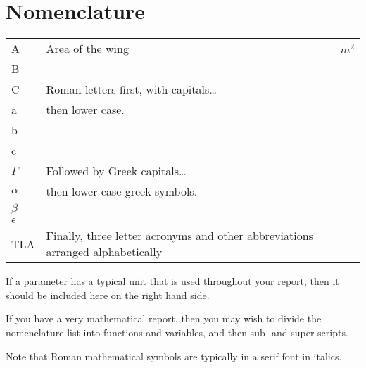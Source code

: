 \documentclass[a4paper,oneside,12pt]{book}
\begin{document}
\section*{\Huge{Nomenclature}}
\begin{tabular}{lp{9cm}l}
    A        & Area of the wing                                                               & $m^{2}$ \\
    B                                                                                                   \\
    C        & Roman letters first, with capitals\ldots                                                 \\
    a        & then lower case.                                                                         \\
    b                                                                                                   \\
    c                                                                                                   \\
    $\Gamma$ & Followed by Greek capitals\ldots                                                         \\
    $\alpha$ & then lower case greek symbols.                                                           \\
    $\beta$                                                                                             \\
    $\epsilon$                                                                                          \\
    TLA      & Finally, three letter acronyms and other abbreviations arranged alphabetically           \\
\end{tabular}
\vspace{2cm}

If a parameter has a typical unit that is used throughout your report, then it should be included here on the right hand side.

If you have a very mathematical report, then you may wish to divide the nomenclature list into functions and variables, and then sub- and super-scripts.

Note that Roman mathematical symbols are typically in a serif font in italics.

\mainmatter






\appendix
\renewcommand{\thechapter}{A\arabic{chapter}}

\end{document}
